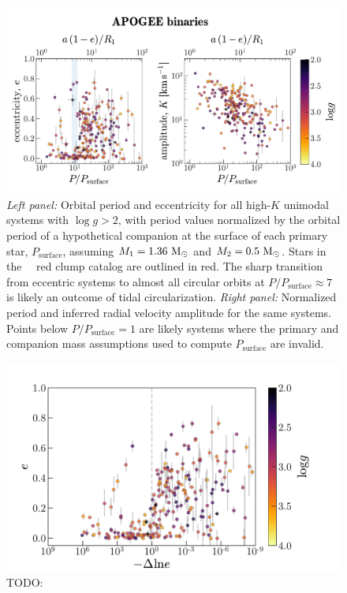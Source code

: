 \documentclass[modern, letterpaper]{aastex62}
\newcommand{\apogee}{\project{\acronym{APOGEE}}}
\newcommand{\DR}{\acronym{DR14}}
\begin{document}
\begin{figure}[h]
\begin{center}
\includegraphics[width=\textwidth]{P-e-K}
\end{center}
\caption{%
\textit{Left panel:} Orbital period and eccentricity for all high-$K$ unimodal
systems with $\log g > 2$, with period values normalized by the orbital period
of a hypothetical companion at the surface of each primary star,
$P_{\textrm{surface}}$, assuming $M_1 = 1.36~\mathrm{M}_\odot$ and $M_2 = 0.5~\mathrm{M}_\odot$.
Stars in the \apogee\ \DR\ red clump catalog are outlined in red.
The sharp transition from eccentric systems to almost all circular orbits at
$P/P_\textrm{surface} \approx 7$ is likely an outcome of tidal circularization.
\textit{Right panel:} Normalized period and inferred radial velocity amplitude
for the same systems.
Points below $P/P_\textrm{surface} = 1$ are likely systems where the primary and
companion mass assumptions used to compute $P_\textrm{surface}$ are invalid.
\label{fig:PeK}
}
\end{figure}

\begin{figure}[h]
\begin{center}
\includegraphics[width=\textwidth]{dlne}
\end{center}
\caption{%
TODO:
\label{fig:dlne}
}
\end{figure}
\end{document}
